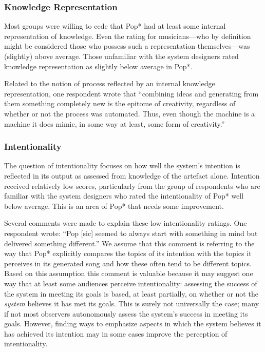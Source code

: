 \documentclass[phd,electronic,oneside,twosidetoc,letterpaper,chaptercenter,parttop,lol,lof,lot]{byumsphd}
\begin{document}
\subsubsection{Knowledge Representation}

Most groups were willing to cede that Pop* had at least some internal representation of knowledge. Even the rating for musicians---who by definition might be considered those who possess such a representation themselves---was (slightly) above average. Those unfamiliar with the system designers rated knowledge representation as slightly below average in Pop*.

Related to the notion of process reflected by an internal knowledge representation, one respondent wrote that ``combining ideas and generating from them something completely new is the epitome of creativity, regardless of whether or not the process was automated.  Thus, even though the machine is a machine it does mimic, in some way at least, some form of creativity.''

\subsubsection{Intentionality}

The question of intentionality focuses on how well the system's intention is reflected in its output as assessed from knowledge of the artefact alone. Intention received relatively low scores, particularly from the group of respondents who are familiar with the system designers who rated the intentionality of Pop* well below average. This is an area of Pop* that needs some improvement.

Several comments were made to explain these low intentionality ratings. One respondent wrote: ``Pop [sic] seemed to always start with something in mind but delivered something different.'' We assume that this comment is referring to the way that Pop* explicitly compares the topics of its intention with the topics it perceives in its generated song and how these often tend to be different topics. Based on this assumption this comment is valuable because it may suggest one way that at least some audiences perceive intentionality: assessing the success of the system in meeting its goals is based, at least partially, on whether or not the \textit{system} believes it has met its goals. This is surely not universally the case; many if not most observers autonomously assess the system's success in meeting its goals. However, finding ways to emphasize aspects in which the system believes it has achieved its intention may in some cases improve the perception of intentionality.
\end{document}
